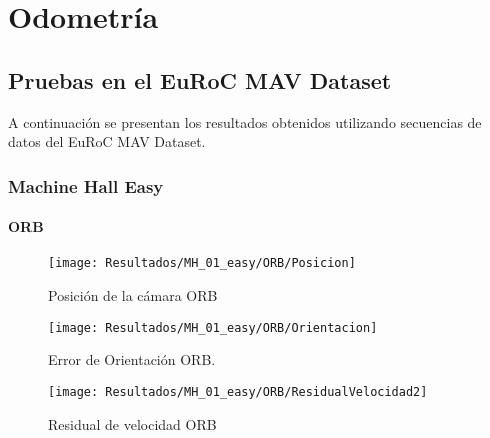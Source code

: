 \chapter{Odometría}
\label{capitulo4}

\section{Pruebas en el EuRoC MAV Dataset}
A continuación se presentan los resultados obtenidos
utilizando secuencias de datos del EuRoC MAV Dataset.


\subsection{Machine Hall Easy}

\subsubsection{ORB}


\begin{figure}[H]
	\centering
	\texttt{[image: Resultados/MH\_01\_easy/ORB/Posicion]}
	\caption{Posición de la cámara ORB}
	\label{imagen:Resultados/MH_01_easy/ORB/Posicion}
\end{figure}


\begin{figure}[H]
	\centering
	\texttt{[image: Resultados/MH\_01\_easy/ORB/Orientacion]}
	\caption[Error de Orientación ORB]{Error de Orientación ORB.}
	\label{imagen:Resultados/MH_01_easy/ORB/Orientacion}
\end{figure}



\begin{figure}[H]
	\centering
	\texttt{[image: Resultados/MH\_01\_easy/ORB/ResidualVelocidad2]}
	\caption{Residual de velocidad ORB}
	\label{imagen:Resultados/MH_01_easy/ORB/ResidualVelocidad}
\end{figure}



